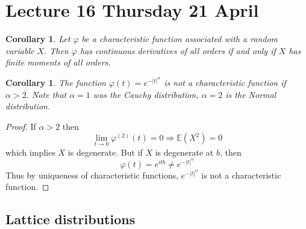 \documentclass[10pt, oneside, reqno]{amsart}
\theoremstyle{plain}%
\newtheorem{cor}[thm]{Corollary}
\theoremstyle{definition}
\theoremstyle{remark}
\renewcommand{\phi}{\varphi}
\newcommand{\E}{\mathbb{E}}
\begin{document}
\section{Lecture 16 Thursday 21 April} %
\label{sec:lecture_16_thursday_21_april}
    \begin{cor}
        Let $\phi$ be a characteristic function associated with a random variable $X$.  Then $\phi$ has continuous derivatives of all orders if and only if $X$ has finite moments of all orders.  
    \end{cor}
    
    \begin{cor}
        The function $\phi(t) = e^{-|t|^\alpha}$ is not a characteristic function if $\alpha > 2$.  Note that $\alpha = 1$ was the Cauchy distribution, $\alpha  = 2$ is the Normal distribution.
    \end{cor}
    
    \begin{proof}
        If $\alpha > 2$ then \[
            \lim_{t \rightarrow 0 } \phi^{(2)}(t) = 0 \Rightarrow \E(X^2) = 0
        \] which implies $X$ is degenerate.  But if $X$ is degenerate at $b$, then \[
            \phi(t) = e^{itb} \neq e^{-|t|^\alpha}
        \]  Thus by uniqueness of characteristic functions, $e^{-|t|^\alpha}$ is not a characteristic function.
    \end{proof}

\subsection{Lattice distributions} %
\label{sub:lattice_distributions}
\end{document}
